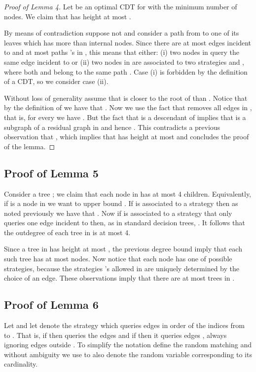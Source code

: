 \documentclass[12pt]{article}
\begin{document}
		\begin{proof}[Proof of Lemma 4]
			Let  be an optimal CDT for  with the minimum number of nodes. We claim that  has height at most .
			
			By means of contradiction suppose not and consider a path  from  to one of its leaves which has more than  internal nodes. Since there are at most  edges incident to  and at most  paths 's in , this means that either: (i) two nodes in  query the same edge incident to  or (ii) two nodes  in  are associated to two strategies  and , where both  and  belong to the same path . Case (i) is forbidden by the definition of a CDT, so we consider case (ii). 
			
			Without loss of generality assume that  is closer to the root of  than . Notice that by the definition of  we have that . Now we use the fact that  removes all edges in , that is, for every  we have . But the fact that  is a descendant of  implies that  is a subgraph of a residual graph in  and hence . This contradicts a previous observation that , which implies that  has height at most  and concludes the proof of the lemma.  
		\end{proof}
		

	\subsection{Proof of Lemma 5}
	
			Consider a tree ; we claim that each node in  has at most 4 children. Equivalently, if  is a node in  we want to upper bound . If  is associated to a strategy  then as noted previously we have that . Now if  is associated to a strategy that only queries one edge  incident to  then, as in standard decision trees, . It follows that the outdegree of each tree in  is at most 4.
		
		Since a tree in  has height at most , the previous degree bound imply that each such tree has at most  nodes. Now notice that each node has one of  possible strategies, because the strategies 's allowed in  are uniquely determined by the choice of an edge. These observations imply that there are at most  trees in .
		



	\subsection{Proof of Lemma 6}
	
	Let  and let  denote the strategy which queries edges  in order of the indices from  to . That is, if  then  queries the edges  and if  then it queries edges , always ignoring edges outside . To simplify the notation define the random matching  and without ambiguity we use  to also denote the random variable  corresponding to its cardinality. 
	
\end{document}
